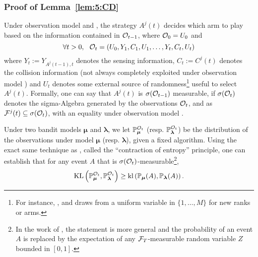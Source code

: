 
\subsubsection{Proof of Lemma~\ref{lem:5:CD}}

Under observation model \modelun{} and \modeldeux, the strategy $A^j(t)$ decides which arm to play based on the information contained in $\mathcal{O}_{t-1}$, where $\mathcal{O}_0 = U_0$ and
\[\forall t > 0, \ \ \mathcal{O}_t = (U_0,Y_1,C_1,U_1,\dots,Y_t,C_t,U_t)\]
where $Y_{t} := Y_{A^j(t-1),t}$ denotes the sensing information, $C_t := C^j(t)$ denotes the collision information (not always completely exploited under observation model \modeldeux) and $U_t$ denotes some external source of randomness\footnote{For instance, \MCTopM, \RandTopM{} and \rhoRand{} draws from a uniform variable in $\{1,\dots,M\}$ for new ranks or arms.} useful to select $A^j(t)$.
Formally, one can say that $A^j(t)$ is $\sigma(\mathcal{O}_{t-1})$ measurable, if $\sigma(\mathcal{O}_t)$ denotes the sigma-Algebra generated by the observations $\mathcal{O}_t$, and as $\mathcal{F}^j(t) \subseteq \sigma(\mathcal{O}_{t})$, with an equality under observation model \modelun.

Under two bandit models $\bm{\mu}$ and $\bm{\lambda}$, we let $\mathbb{P}_{\bm{\mu}}^{\mathcal{O}_t}$ (resp. $\mathbb{P}_{\bm{\lambda}}^{\mathcal{O}_t}$) be the distribution of the observations under model $\bm{\mu}$ (resp. $\bm{\lambda}$), given a fixed algorithm.
Using the exact same technique as \cite{Garivier16TrueShape}, called the ``contraction of entropy'' principle, one can establish that for any event $A$ that is $\sigma(\mathcal{O}_t)$-measurable\footnote{In the work of \cite{Garivier16TrueShape}, the statement is more general and the probability of an event $A$ is replaced by the expectation of any $\mathcal{F}_T$-measurable random variable $Z$ bounded in $[0,1]$.},
\[\mathrm{KL}\left(\mathbb{P}_{\bm{\mu}}^{\mathcal{O}_t},\mathbb{P}_{\bm{\lambda}}^{\mathcal{O}_t}\right) \geq \mathrm{kl}\left(\mathbb{P}_{\bm{\mu}}(A),\mathbb{P}_{\bm{\lambda}}(A)\right).\]

